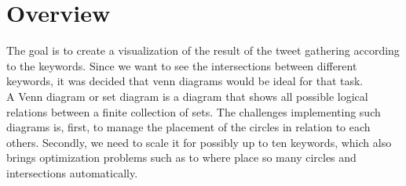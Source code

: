 \section{Overview}
The goal is to create a visualization of the result of the tweet gathering according to the keywords. Since we want to see the intersections between different keywords, it was decided that venn diagrams would be ideal for that task.\\
A Venn diagram or set diagram is a diagram that shows all possible logical relations between a finite collection of sets. The challenges implementing such diagrams is, first, to manage the placement of the circles in relation to each others. Secondly, we need to scale it for possibly up to ten keywords, which also brings optimization problems such as to where place so many circles and intersections automatically.\\